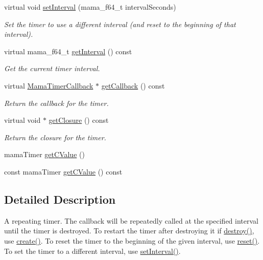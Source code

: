 \begin{DoxyCompactItemize}
virtual void \hyperlink{classWombat_1_1MamaTimer_abdc5c7645dc4d9df6c8b778cbd0afcaa}{setInterval} (mama\_\-f64\_\-t intervalSeconds)
\begin{DoxyCompactList}\small\item\em Set the timer to use a different interval (and reset to the beginning of that interval). \item\end{DoxyCompactList}\item 
virtual mama\_\-f64\_\-t \hyperlink{classWombat_1_1MamaTimer_a6c6559f913fa0d154fc77d12b8322fb6}{getInterval} () const 
\begin{DoxyCompactList}\small\item\em Get the current timer interval. \item\end{DoxyCompactList}\item 
virtual \hyperlink{classWombat_1_1MamaTimerCallback}{MamaTimerCallback} $\ast$ \hyperlink{classWombat_1_1MamaTimer_aa973028ea1d0525df485173c8e0de38f}{getCallback} () const 
\begin{DoxyCompactList}\small\item\em Return the callback for the timer. \item\end{DoxyCompactList}\item 
virtual void $\ast$ \hyperlink{classWombat_1_1MamaTimer_adf7385bd2cb4d41b8da8b3011cde1fdb}{getClosure} () const 
\begin{DoxyCompactList}\small\item\em Return the closure for the timer. \item\end{DoxyCompactList}\item 
mamaTimer \hyperlink{classWombat_1_1MamaTimer_a236a512b1ee0014b1898233c962c8383}{getCValue} ()
\item 
const mamaTimer \hyperlink{classWombat_1_1MamaTimer_ac66a5f4a2d726c6017eb05fde1726fcb}{getCValue} () const 
\end{DoxyCompactItemize}


\subsection{Detailed Description}
A repeating timer. The callback will be repeatedly called at the specified interval until the timer is destroyed. To restart the timer after destroying it if \hyperlink{classWombat_1_1MamaTimer_ab2679f665be9f30904d7ac2d70a67875}{destroy()}, use \hyperlink{classWombat_1_1MamaTimer_a2d093ee2832a58fa2066165d81c33855}{create()}. To reset the timer to the beginning of the given interval, use \hyperlink{classWombat_1_1MamaTimer_a11812aff6b0effb65fe845c3391033e1}{reset()}. To set the timer to a different interval, use \hyperlink{classWombat_1_1MamaTimer_abdc5c7645dc4d9df6c8b778cbd0afcaa}{setInterval()}.


